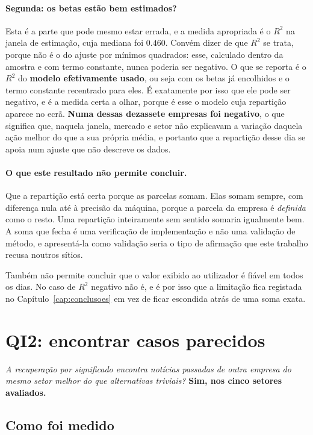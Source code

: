 \paragraph{Segunda: os betas estão bem estimados?}
Esta é a parte que pode mesmo estar errada, e a medida apropriada é o $R^2$ na janela de
estimação, cuja mediana foi $0.460$. Convém dizer de que $R^2$ se trata, porque não é o do
ajuste por mínimos quadrados: esse, calculado dentro da amostra e com termo constante, nunca
poderia ser negativo. O que se reporta é o $R^2$ do \textbf{modelo efetivamente usado}, ou seja com
os betas já encolhidos e o termo constante recentrado para eles. É exatamente por isso que ele pode
ser negativo, e é a medida certa a olhar, porque é esse o modelo cuja repartição aparece no ecrã. \textbf{Numa dessas dezassete empresas foi negativo}, o que significa que,
naquela janela, mercado e setor não explicavam a variação daquela ação melhor do que a sua própria
média, e portanto que a repartição desse dia se apoia num ajuste que não descreve os dados.

\paragraph{O que este resultado não permite concluir.}
Que a repartição está certa porque as parcelas somam. Elas somam sempre, com diferença nula até à
precisão da máquina, porque a parcela da empresa é \emph{definida} como o resto. Uma repartição
inteiramente sem sentido somaria igualmente bem. A soma que fecha é uma verificação de implementação
e não uma validação de método, e apresentá-la como validação seria o tipo de afirmação que este
trabalho recusa noutros sítios.

Também não permite concluir que o valor exibido ao utilizador é fiável em todos os dias. No caso de
$R^2$ negativo não é, e é por isso que a limitação fica registada no
Capítulo~\ref{cap:conclusoes} em vez de ficar escondida atrás de uma soma exata.

\section{QI2: encontrar casos parecidos}
\label{sec:av_qi2}

\emph{A recuperação por significado encontra notícias passadas de outra empresa do mesmo setor
melhor do que alternativas triviais?} \textbf{Sim, nos cinco setores avaliados.}

\subsection{Como foi medido}


